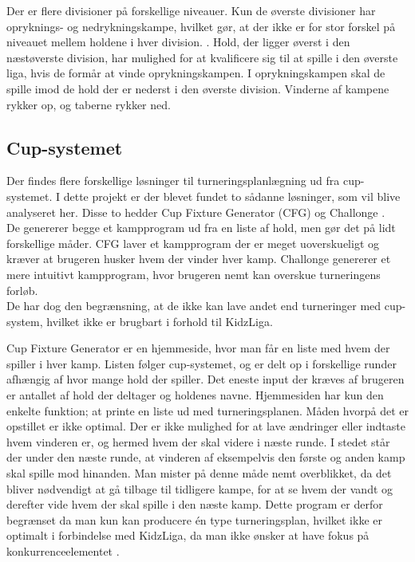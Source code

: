 Der er flere divisioner på forskellige niveauer. Kun de øverste divisioner har opryknings- og nedrykningskampe, hvilket gør, at der ikke er for stor forskel på niveauet mellem holdene i hver division. \cite{Landsturnering}. Hold, der ligger øverst i den næstøverste division, har mulighed for at kvalificere sig til at spille i den øverste liga, hvis de formår at vinde oprykningskampen. I oprykningskampen skal de spille imod de hold der er nederst i den øverste division. Vinderne af kampene rykker op, og taberne rykker ned.\\



\subsection*{Cup-systemet}
Der findes flere forskellige løsninger til turneringsplanlægning ud fra cup-systemet. I dette projekt er der blevet fundet to sådanne løsninger, som vil blive analyseret her. Disse to hedder Cup Fixture Generator (CFG) og Challonge \citep{CupFixtureGenerator}\citep{challonge}.\\
De genererer begge et kampprogram ud fra en liste af hold, men gør det på lidt forskellige måder. CFG laver et kampprogram der er meget uoverskueligt og kræver at brugeren husker hvem der vinder hver kamp. Challonge genererer et mere intuitivt kampprogram, hvor brugeren nemt kan overskue turneringens forløb.\\
De har dog den begrænsning, at de ikke kan lave andet end turneringer med cup-system, hvilket ikke er brugbart i forhold til KidzLiga.

Cup Fixture Generator er en hjemmeside, hvor man får en liste med hvem der spiller i hver kamp. Listen følger cup-systemet, og er delt op i forskellige runder afhængig af hvor mange hold der spiller. Det eneste input der kræves af brugeren er antallet af hold der deltager og holdenes navne. Hjemmesiden har kun den enkelte funktion; at printe en liste ud med turneringsplanen. Måden hvorpå det er opstillet er ikke optimal. Der er ikke mulighed for at lave ændringer eller indtaste hvem vinderen er, og hermed hvem der skal videre i næste runde. I stedet står der under den næste runde, at vinderen af eksempelvis den første og anden kamp skal spille mod hinanden. Man mister på denne måde nemt overblikket, da det bliver nødvendigt at gå tilbage til tidligere kampe, for at se hvem der vandt og derefter vide hvem der skal spille i den næste kamp. Dette program er derfor begrænset da man kun kan producere én type turneringsplan, hvilket ikke er optimalt i forbindelse med KidzLiga, da man ikke ønsker at have fokus på konkurrenceelementet .

